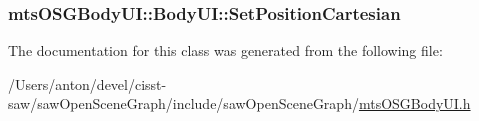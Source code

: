 \subsubsection[{Set\+Position\+Cartesian}]{ mts\+O\+S\+G\+Body\+U\+I\+::\+Body\+U\+I\+::\+Set\+Position\+Cartesian}\label{classmts_o_s_g_body_u_i_1_1_body_u_i_a60f80540e054d34498cfc08945cd512e}


The documentation for this class was generated from the following file\+:\begin{DoxyCompactItemize}
\item 
/\+Users/anton/devel/cisst-\/saw/saw\+Open\+Scene\+Graph/include/saw\+Open\+Scene\+Graph/\hyperlink{mts_o_s_g_body_u_i_8h}{mts\+O\+S\+G\+Body\+U\+I.\+h}\end{DoxyCompactItemize}
